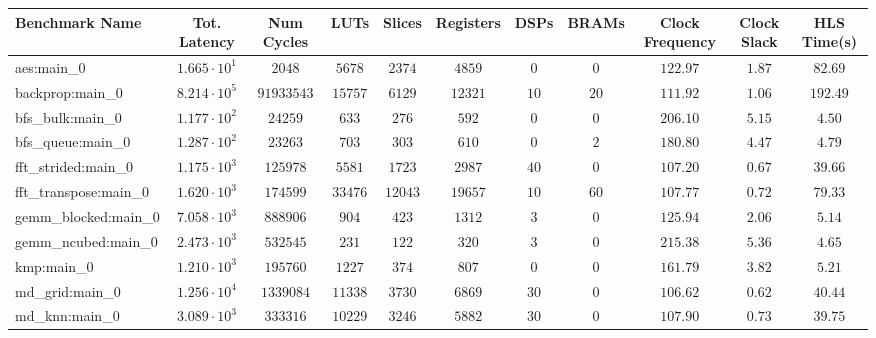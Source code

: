 \begin{tabular}{|l|c|c|c|c|c|c|c|c|c|c|}
\hline
Benchmark Name         & Tot. Latency           & Num Cycles   & LUTs       & Slices    & Registers & DSPs    & BRAMs  & Clock Frequency & Clock Slack & HLS Time(s) \\
\hline
aes:main\_0            & $ 1.665 \cdot 10^{1} $ & $ 2048     $ & $ 5678   $ & $ 2374  $ & $ 4859  $ & $ 0   $ & $ 0  $ & $ 122.97      $ & $ 1.87    $ & $ 82.69   $ \\
backprop:main\_0       & $ 8.214 \cdot 10^{5} $ & $ 91933543 $ & $ 15757  $ & $ 6129  $ & $ 12321 $ & $ 10  $ & $ 20 $ & $ 111.92      $ & $ 1.06    $ & $ 192.49  $ \\
bfs\_bulk:main\_0      & $ 1.177 \cdot 10^{2} $ & $ 24259    $ & $ 633    $ & $ 276   $ & $ 592   $ & $ 0   $ & $ 0  $ & $ 206.10      $ & $ 5.15    $ & $ 4.50    $ \\
bfs\_queue:main\_0     & $ 1.287 \cdot 10^{2} $ & $ 23263    $ & $ 703    $ & $ 303   $ & $ 610   $ & $ 0   $ & $ 2  $ & $ 180.80      $ & $ 4.47    $ & $ 4.79    $ \\
fft\_strided:main\_0   & $ 1.175 \cdot 10^{3} $ & $ 125978   $ & $ 5581   $ & $ 1723  $ & $ 2987  $ & $ 40  $ & $ 0  $ & $ 107.20      $ & $ 0.67    $ & $ 39.66   $ \\
fft\_transpose:main\_0 & $ 1.620 \cdot 10^{3} $ & $ 174599   $ & $ 33476  $ & $ 12043 $ & $ 19657 $ & $ 10  $ & $ 60 $ & $ 107.77      $ & $ 0.72    $ & $ 79.33   $ \\
gemm\_blocked:main\_0  & $ 7.058 \cdot 10^{3} $ & $ 888906   $ & $ 904    $ & $ 423   $ & $ 1312  $ & $ 3   $ & $ 0  $ & $ 125.94      $ & $ 2.06    $ & $ 5.14    $ \\
gemm\_ncubed:main\_0   & $ 2.473 \cdot 10^{3} $ & $ 532545   $ & $ 231    $ & $ 122   $ & $ 320   $ & $ 3   $ & $ 0  $ & $ 215.38      $ & $ 5.36    $ & $ 4.65    $ \\
kmp:main\_0            & $ 1.210 \cdot 10^{3} $ & $ 195760   $ & $ 1227   $ & $ 374   $ & $ 807   $ & $ 0   $ & $ 0  $ & $ 161.79      $ & $ 3.82    $ & $ 5.21    $ \\
md\_grid:main\_0       & $ 1.256 \cdot 10^{4} $ & $ 1339084  $ & $ 11338  $ & $ 3730  $ & $ 6869  $ & $ 30  $ & $ 0  $ & $ 106.62      $ & $ 0.62    $ & $ 40.44   $ \\
md\_knn:main\_0        & $ 3.089 \cdot 10^{3} $ & $ 333316   $ & $ 10229  $ & $ 3246  $ & $ 5882  $ & $ 30  $ & $ 0  $ & $ 107.90      $ & $ 0.73    $ & $ 39.75   $ \\

\end{tabular}
